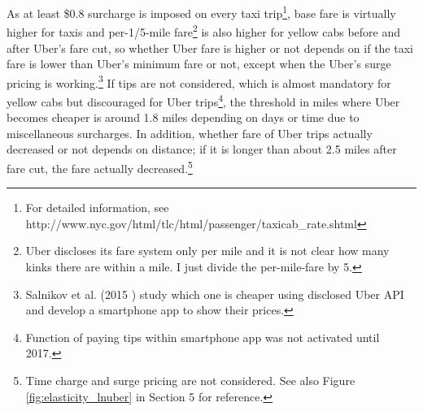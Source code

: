 As at least \$0.8 surcharge is imposed on every taxi trip\footnote{For detailed information, see http://www.nyc.gov/html/tlc/html/passenger/taxicab\_rate.shtml}, base fare is virtually higher for taxis and per-1/5-mile fare\footnote{Uber discloses its fare system only per mile and it is not clear how many kinks there are within a mile. I just divide the per-mile-fare by 5.} is also higher for yellow cabs before and after Uber's fare cut, so whether Uber fare is higher or not depends on if the taxi fare is lower than Uber's minimum fare or not, except when the Uber's surge pricing is working.\footnote{Salnikov et al. (2015 \cite{salnikov2015openstreetcab}) study which one is cheaper using disclosed Uber API and develop a smartphone app to show their prices.} If tips are not considered, which is almost mandatory for yellow cabs but discouraged for Uber trips\footnote{Function of paying tips within smartphone app was not activated until 2017.}, the threshold in miles where Uber becomes cheaper is around 1.8 miles depending on days or time due to miscellaneous surcharges. In addition, whether fare of Uber trips actually decreased or not depends on distance; if it is longer than about 2.5 miles after fare cut, the fare actually decreased.\footnote{Time charge and surge pricing are not considered. See also Figure \ref{fig:elasticity_lnuber} in Section 5 for reference.} 
